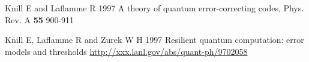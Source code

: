 \documentclass{article}
\begin{document}
\begin{thebibliography}{12}

% 
% 
% 
% 
% 
% 
% 
% 
% 
% 
% 
% 
% 
% 
% 
% 
% 
% 
% 

Knill E and Laflamme R 1997
A theory of quantum error-correcting codes,
Phys. Rev. A {\bf 55} 900-911

Knill E, Laflamme R and Zurek W H 1997
Resilient quantum computation: error models and thresholds
\hyperref{http://xxx.lanl.gov/abs/quant-ph/9702058}{}{}
{http://xxx.lanl.gov/abs/quant-ph/9702058}




\end{thebibliography}
\end{document}
